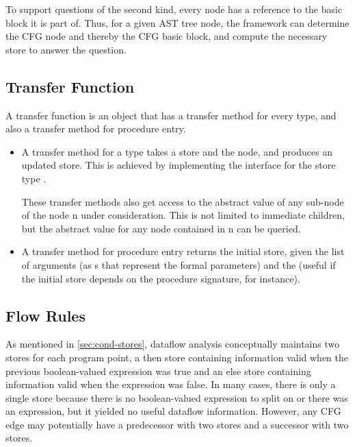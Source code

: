 To support questions of the second kind, every node has a reference to
the basic block it is part of. Thus, for a given AST tree node, the
framework can determine the CFG node and thereby the CFG basic block,
and compute the necessary store to answer the question.


\subsection{Transfer Function}
\label{sec:transfer-fnc}

A transfer function is an object that has a transfer method for
every  type, and also a transfer method for procedure entry.

\begin{itemize}
\item A transfer method for a  type takes a store
  and the node, and produces an updated store. This is achieved by
  implementing the  interface for the store
  type .

  These transfer methods also get access to the abstract value of any
  sub-node of the node \code n under consideration.  This is not limited
  to immediate children, but the abstract value for any node contained
  in \code n can be queried.

\item A transfer method for procedure entry returns the initial store, given the
  list of arguments (as s that represent the formal
  parameters) and the
   (useful if the initial store depends on the procedure
  signature, for instance).

\end{itemize}


\subsection{Flow Rules}
\label{sec:flow-rules}

As mentioned in \autoref{sec:cond-stores}, dataflow analysis
conceptually maintains two stores for each program point, a then store
containing information valid when the previous boolean-valued
expression was true and an else store containing information valid
when the expression was false.  In many cases, there is only a single
store because there is no boolean-valued expression to split on or
there was an expression, but it yielded no useful dataflow
information.  However, any CFG edge may potentially have a predecessor
with two stores and a successor with two stores.

